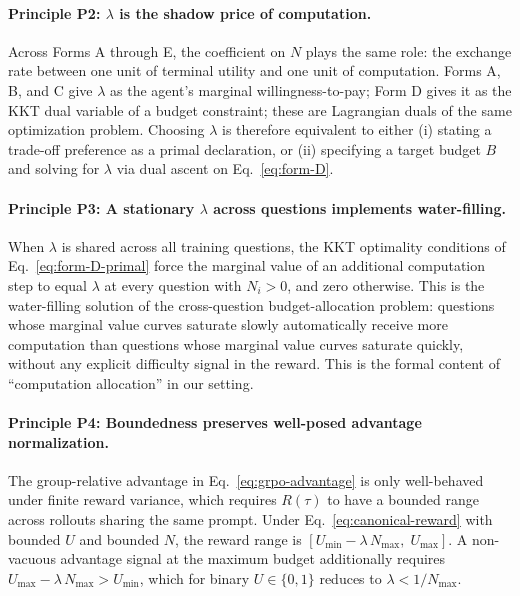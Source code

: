 \paragraph{Principle P2: $\lambda$ is the shadow price of computation.}
Across Forms A through E, the coefficient on $N$ plays the same role: the exchange rate between one unit of terminal utility and one unit of computation. Forms A, B, and C give $\lambda$ as the agent's marginal willingness-to-pay; Form D gives it as the KKT dual variable of a budget constraint; these are Lagrangian duals of the same optimization problem. Choosing $\lambda$ is therefore equivalent to either (i) stating a trade-off preference as a primal declaration, or (ii) specifying a target budget $B$ and solving for $\lambda$ via dual ascent on Eq.~\eqref{eq:form-D}.

\paragraph{Principle P3: A stationary $\lambda$ across questions implements water-filling.}
When $\lambda$ is shared across all training questions, the KKT optimality conditions of Eq.~\eqref{eq:form-D-primal} force the marginal value of an additional computation step to equal $\lambda$ at every question with $N_i > 0$, and zero otherwise. This is the water-filling solution of the cross-question budget-allocation problem: questions whose marginal value curves saturate slowly automatically receive more computation than questions whose marginal value curves saturate quickly, without any explicit difficulty signal in the reward. This is the formal content of ``computation allocation'' in our setting.

\paragraph{Principle P4: Boundedness preserves well-posed advantage normalization.}
The group-relative advantage in Eq.~\eqref{eq:grpo-advantage} is only well-behaved under finite reward variance, which requires $R(\tau)$ to have a bounded range across rollouts sharing the same prompt. Under Eq.~\eqref{eq:canonical-reward} with bounded $U$ and bounded $N$, the reward range is $[U_{\min} - \lambda\,N_{\max},\; U_{\max}]$. A non-vacuous advantage signal at the maximum budget additionally requires $U_{\max} - \lambda\,N_{\max} > U_{\min}$, which for binary $U\in\{0,1\}$ reduces to $\lambda < 1/N_{\max}$.

